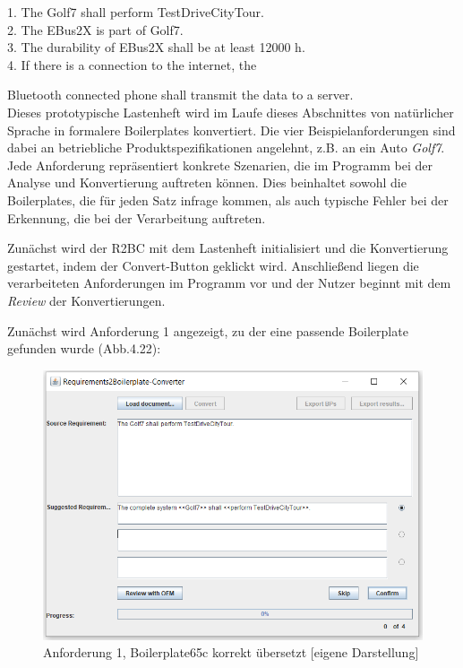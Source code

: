 \documentclass[12pt]{report}
\begin{document}
1. The Golf7 shall perform TestDriveCityTour.\\

2. The EBus2X is part of Golf7.\\

3. The durability of EBus2X shall be at least 12000 h.\\

4. If there is a connection to the internet, the 

Bluetooth connected phone shall transmit the data to a server.\\

Dieses prototypische Lastenheft wird im Laufe dieses Abschnittes von natürlicher Sprache in formalere Boilerplates konvertiert. Die vier Beispielanforderungen sind dabei an betriebliche Produktspezifikationen angelehnt, z.B. an ein Auto \textit{Golf7}. Jede Anforderung repräsentiert konkrete Szenarien, die im Programm bei der Analyse und Konvertierung auftreten können. Dies beinhaltet sowohl die Boilerplates, die für jeden Satz infrage kommen, als auch typische Fehler bei der Erkennung, die bei der Verarbeitung auftreten.

Zunächst wird der R2BC mit dem Lastenheft initialisiert und die Konvertierung gestartet, indem der Convert-Button geklickt wird. Anschließend liegen die verarbeiteten Anforderungen im Programm vor und der Nutzer beginnt mit dem \textit{Review} der Konvertierungen. 

Zunächst wird Anforderung 1 angezeigt, zu der eine passende Boilerplate gefunden wurde (Abb.4.22):

\begin{figure}[h!]
\begin{center}
\includegraphics[scale=0.7]{Bilder/GUI-req1.png}
\caption{Anforderung 1, Boilerplate65c korrekt übersetzt [eigene Darstellung]}
\end{center}
\end{figure}
\end{document}
